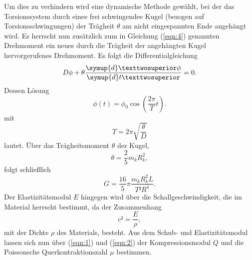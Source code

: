 Um dies zu verhindern wird eine dynamische Methode gewählt, bei der das Torsionssystem durch einee frei schwingendee Kugel (bezogen auf Torsionsschwingungen) der Trägheit $\theta$ am nicht eingespannten Ende angehängt wird.
Es herrscht nun zusätzlich zum in Gleichung (\ref{eqn:4}) genannten Drehmoment ein neues durch die Trägheit der angehängten Kugel hervorgerufenes Drehmoment.
Es folgt die Differentialgleichung
\begin{equation}
  D \phi + \theta \frac{\symup{d}²\phi}{\symup{d}t²} = 0.
\end{equation}
Dessen Lösung
\begin{equation}
  \phi (t) = \phi_0\cos\left(\frac{2\pi}{T}t\right). \label{eqn:5}
\end{equation}
mit
\begin{equation}
  T = 2\pi\sqrt{\frac{\theta}{D}} \label{eqn:6}
\end{equation}
lautet.
Über das Trägheitsmoment $\theta$ der Kugel,
\begin{equation}
  \theta = \frac{2}{5}m_k R_k^2, \label{eqn:6}
\end{equation}
folgt schließlich
\begin{equation}
  G = \frac{16}{5}\pi\frac{m_k R_k^2 L}{T²R^4}. \label{eqn:7}
\end{equation}
Der Elastizitätsmodul $E$ hingegen wird über die Schallgeschwindigkeit, die im Material herrscht bestimmt, da der Zusammenhang
\begin{equation}
  c² = \frac{E}{\rho},
\end{equation}
mit der Dichte $\rho$ des Materials, besteht.
Aus dem Schub- und Elastizitätsmodul lassen sich nun über (\ref{eqn:1}) und (\ref{eqn:2}) der Kompressionsmodul $Q$ und die Poissonsche Querkontraktionszahl $\mu$ bestimmen.
